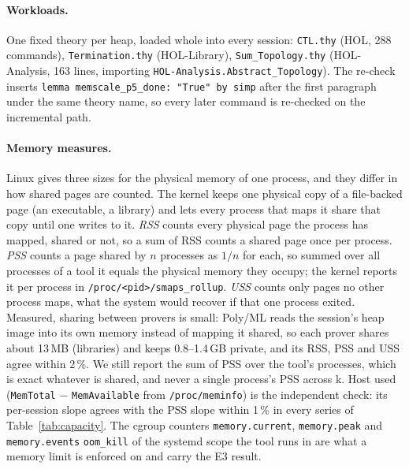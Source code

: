 \documentclass[11pt]{article}
\newcommand{\code}[1]{\colorbox{gray!12}{\texttt{\vphantom{Ag}#1}}}
\begin{document}
\paragraph{Workloads.} One fixed theory per heap, loaded whole into every
session: \code{CTL.thy} (HOL, 288 commands), \code{Termination.thy}
(HOL-Library), \code{Sum\_Topology.thy} (HOL-Analysis, 163 lines,
importing \code{HOL-Analysis.Abstract\_Topology}). The re-check inserts
\texttt{lemma memscale\_p5\_done: "True" by simp} after the first paragraph
under the same theory name, so every later command is re-checked on the
incremental path.

\paragraph{Memory measures.} Linux gives three sizes for the physical
memory of one process, and they differ in how shared pages are counted.
The kernel keeps one physical copy of a file-backed page (an executable, a
library) and lets every process that maps it share that copy until one
writes to it. \emph{RSS} counts every physical page the process has
mapped, shared or not, so a sum of RSS counts a shared page once per
process. \emph{PSS} counts a page shared by $n$ processes as $1/n$ for
each, so summed over all processes of a tool it equals the physical memory
they occupy; the kernel reports it per process in
\code{/proc/<pid>/smaps\_rollup}. \emph{USS} counts only pages no other
process maps, what the system would recover if that one process exited.
Measured, sharing between provers is small: Poly/ML reads the session's
heap image into its own memory instead of mapping it shared, so each
prover shares about 13\,MB (libraries) and keeps 0.8--1.4\,GB private, and
its RSS, PSS and USS agree within 2\,\%. We still report the sum of PSS
over the tool's processes, which is exact whatever is shared, and never a
single process's PSS across k. Host used (\code{MemTotal} $-$ \code{MemAvailable} from
\code{/proc/meminfo}) is the independent check: its per-session slope
agrees with the PSS slope within 1\,\% in every series of
Table~\ref{tab:capacity}. The cgroup counters \code{memory.current},
\code{memory.peak} and \code{memory.events} \code{oom\_kill} of the
systemd scope the tool runs in are what a memory limit is enforced on and
carry the E3 result.
\end{document}
